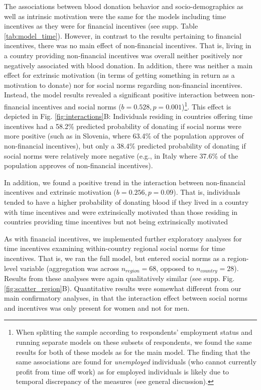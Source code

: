 \documentclass[AER]{AEA}
\begin{document}
The associations between blood donation behavior and socio-demographics as well as intrinsic motivation were the same for the models including time incentives as they were for financial incentives (see supp. Table \ref{tab:model_time}). However, in contrast to the results pertaining to financial incentives, there was no main effect of non-financial incentives. That is, living in a country providing non-financial incentives was overall neither positively nor negatively associated with blood donation. In addition, there was neither a main effect for extrinsic motivation (in terms of getting something in return as a motivation to donate) nor for social norms regarding non-financial incentives. Instead, the model results revealed a significant positive interaction between non-financial incentives and social norms ($b = 0.528, p = 0.001$)\footnote{ When splitting the sample according to respondents' employment status and running separate models on these subsets of respondents, we found the same results for both of these models as for the main model. The finding that the same associations are found for \textit{unemployed} individuals (who cannot currently profit from time off work) as for employed individuals is likely due to temporal discrepancy of the measures (see general discussion).}. This effect is depicted in Fig. \ref{fig:interactions}B: Individuals residing in countries offering time incentives had a 58.2\% predicted probability of donating if social norms were more positive (such as in Slovenia, where 63.4\% of the population approves of non-financial incentives), but only a 38.4\% predicted probability of donating if social norms were relatively more negative (e.g., in Italy where 37.6\% of the population approves of non-financial incentives). %

In addition, we found a positive trend in the interaction between non-financial incentives and extrinsic motivation ($b = 0.256, p = 0.09$). That is, individuals tended to have a higher probability of donating blood if they lived in a country with time incentives and were extrinsically motivated than those residing in countries providing time incentives but not being extrinsically motivated %

As with financial incentives, we implemented further exploratory analyses for time incentives examining within-country regional social norms for time incentives. That is, we ran the full model, but entered social norms as a region-level variable (aggregation was across $n_{region} = 68$, opposed to $n_{country} = 28$). Results from these analyses were again qualitatively similar (see supp. Fig. \ref{fig:scatter_region}B). Quantitative results were somewhat different from our main confirmatory analyses, in that the interaction effect between social norms and incentives was only present for women and not for men.
\end{document}

